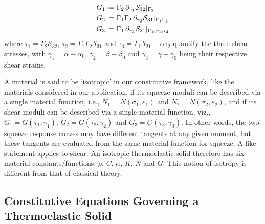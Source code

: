 \begin{subequations}
\begin{align}
    G_1 & \defeq \Gamma_2 \, \partial_{\gamma_1} \mathcal{S}_{32} |_{\Gamma_2} \\ 
    G_2 & \defeq \Gamma_1 \Gamma_2 \, \partial_{\gamma_2} \mathcal{S}_{31} |_{\Gamma_1 \Gamma_2} 
    \label{shearCompliance3D} \\
    G_3 & \defeq \Gamma_1 \, \partial_{\gamma_3} \mathcal{S}_{21} |_{\Gamma_1 , \gamma_1 , \tau_2} 
    \end{align}
\end{subequations}
where $\tau_1 = \Gamma_2 \mathcal{S}_{32}$, $\tau_2 = \Gamma_1 \Gamma_2 \mathcal{S}_{31}$ and $\tau_3 = \Gamma_1 \mathcal{S}_{21} - \alpha \tau_2$ quantify the three shear stresses, with $\gamma_1 = \alpha - \alpha_0$, $\gamma_2 = \beta - \beta_0$ and $\gamma_3 = \gamma - \gamma_0$ being their respective shear strains.

A material is said to be `isotropic' in our constitutive framework, like the materials considered in our application, if its squeeze moduli can be described via a single material function, i.e., $N_1 = N (\sigma_1 , \varepsilon_1 )$ and $N_2 = N ( \sigma_2 , \varepsilon_2 )$, and if its shear moduli can be described via a single material function, viz., $G_1 = G ( \tau_1 , \gamma_1 )$, $G_2 = G ( \tau_2 , \gamma_2 )$ and $G_3 = G ( \tau_3 , \gamma_3 )$.  In other words, the two squeeze response curves may have different tangents at any given moment, but these tangents are evaluated from the same material function for squeeze.  A like statement applies to shear.  An isotropic thermo\-elastic solid therefore has six material constants\slash functions: $\rho$, $C$, $\alpha$, $K$, $N$ and $G$.  This notion of isotropy is different from that of classical theory.

\subsection{Constitutive Equations Governing a Thermoelastic Solid}

